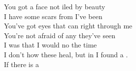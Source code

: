 \songwordfb{} You got a face not iled by beauty \\
\songwordfb{} I have some scars from  I've been \\
\songwordfb{} You've got eyes that can  right through me \\
\songwordfb{} You're not afraid of any they've seen \\
I was  that I would  no 
the  time \\
I don't  how these  heal, but in  I found a . \\
If there is a 
